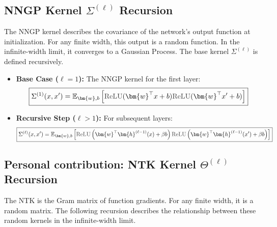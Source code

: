 \documentclass[a4paper]{article}
\newcommand{\ReLU}{\textcolor{relucolor}{\text{ReLU}}}
\DeclareRobustCommand{\ReLU}{\mathrel{\text{%
    \begin{tikzpicture}[baseline=(current bounding box.south)]
        \draw[thick] (0,0) -- (0.25,0) -- (0.4,0.25);
    \end{tikzpicture}}}\!\!}
\theoremstyle{plain}
\theoremstyle{definition}
\theoremstyle{remark}
\begin{document}
\subsection{NNGP Kernel \(\Sigma^{(\ell)}\) Recursion}
The NNGP kernel describes the covariance of the network's output function at initialization. For any finite width, this output is a random function. In the infinite-width limit, it converges to a Gaussian Process. The base kernel $\Sigma^{(\ell)}$ is defined recursively.

\begin{tcolorbox}[colback=blue!10,colframe=blue!80!black,title={\textbf{NNGP Kernel Recursion}},enhanced,drop shadow,boxrule=2pt]
\begin{itemize}
    \item \textbf{Base Case (\(\ell=1\)):} The NNGP kernel for the first layer:
    \begin{equation}
        \boxed{\Sigma^{(1)}(x, x') = \mathbb{E}_{\bm{w},b}\left[\ReLU(\bm{w}^\top x + b)\ReLU(\bm{w}^\top x' + b)\right]}
    \end{equation}
    \item \textbf{Recursive Step (\(\ell > 1\)):} For subsequent layers:
    \begin{equation}
        \boxed{\Sigma^{(\ell)}(x, x') = \mathbb{E}_{\bm{w}, b} \left[ \ReLU\left(\bm{w}^\top \bm{h}^{(\ell-1)}(x) + \beta b\right) \ReLU\left(\bm{w}^\top \bm{h}^{(\ell-1)}(x') + \beta b\right) \right]}
    \end{equation}
\end{itemize}
\end{tcolorbox}















\subsection{Personal contribution: NTK Kernel \(\Theta^{(\ell)}\) Recursion}
The NTK is the Gram matrix of function gradients. For any finite width, it is a random matrix. The following recursion describes the relationship between these random kernels in the infinite-width limit.
\end{document}

